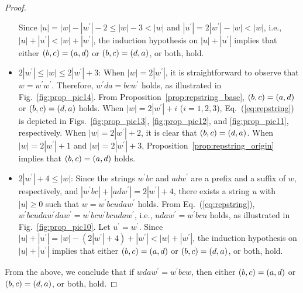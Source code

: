 \begin{proof}
\begin{itemize}
Since $|u| = |w| - |w^{\prime}| - 2 \leq |w| - 3 < |w|$ and $|u^{\prime}| = 2|w^{\prime}| - |w| < |w|$, i.e., $|u| + |u^{\prime}| < |w| + |w^{\prime}|$, the induction hypothesis on $|u| + |u^{\prime}|$ implies that either $(b,c) = (a,d)$ or $(b,c) = (d,a)$, or both, hold.
%
\item $2|w^{\prime}| \le |w| \le 2|w^{\prime}|+3$:
When $|w|=2|w^{\prime}|$, it is straightforward to observe that $w = w^{\prime}w^{\prime}$.
Therefore, $w^{\prime}da = bcw^{\prime}$ holds, as illustrated in Fig.~\ref{fig:prop_pic14}.
From Proposition~\ref{prop:repstring_base}, $(b,c) = (a,d)$ or $(b,c) = (d,a)$ holds.
When $|w|=2|w^{\prime}|+i$ ($i=1,2,3$), Eq.~(\ref{eq:repstring}) is depicted in Figs.~\ref{fig:prop_pic13}, \ref{fig:prop_pic12}, and \ref{fig:prop_pic11}, respectively.
When $|w|=2|w^{\prime}|+2$, it is clear that $(b,c) = (d,a)$. 
When $|w|=2|w^{\prime}|+1$ and $|w|=2|w^{\prime}|+3$, Proposition~\ref{prop:repstring_origin} implies that $(b,c) = (a,d)$ holds.
%
\item $2|w^{\prime}|+4 \leq |w|$:
Since the strings $w^{\prime}bc$ and $adw^{\prime}$ are a prefix and a suffix of $w$, respectively, and $|w^{\prime}bc| + |adw^{\prime}| = 2|w^{\prime}| + 4$, there exists a string $u$ with $|u| \geq 0$ such that $w = w^{\prime}bcudaw^{\prime}$ holds.
From Eq.~(\ref{eq:repstring}), $w^{\prime}bcudaw^{\prime}daw^{\prime} = w^{\prime}bcw^{\prime}bcudaw^{\prime}$, i.e., $udaw^{\prime} = w^{\prime}bcu$ holds, as illustrated in Fig.~\ref{fig:prop_pic10}.
Let $u^{\prime} = w^{\prime}$.
Since $|u| + |u^{\prime}| = |w|- (2|w^{\prime}| + 4) + |w^{\prime}| < |w| + |w^{\prime}|$, the induction hypothesis on $|u| + |u^{\prime}|$ implies that either $(b,c) = (a,d)$ or $(b,c) = (d,a)$, or both, hold.
\end{itemize}
From the above, we conclude that if $wdaw^{\prime} = w^{\prime}bcw$, then either $(b,c) = (a,d)$ or $(b,c) = (d,a)$, or both, hold.
\end{proof}

